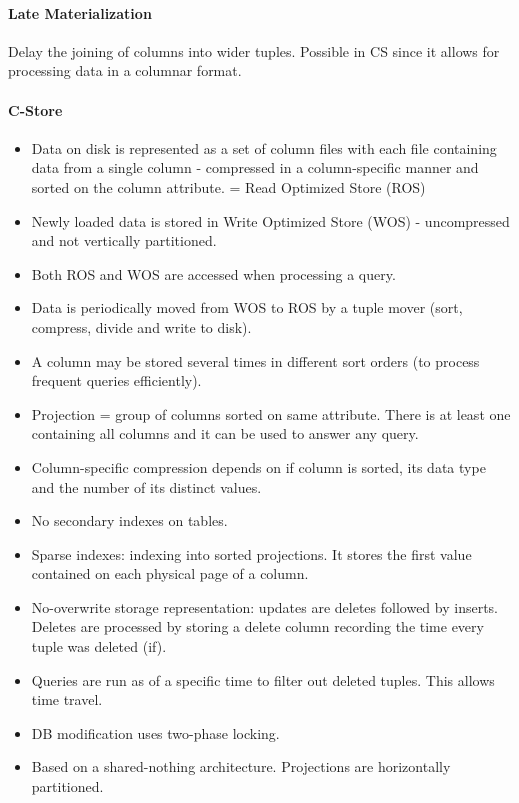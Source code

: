 \paragraph{Late Materialization}
Delay the joining of columns into wider tuples. Possible in CS since it allows for processing data in a columnar format.

\paragraph{C-Store}
\begin{itemize}
    \item Data on disk is represented as a set of column files with each file containing data from a single column - compressed in a column-specific manner and sorted on the column attribute. = Read Optimized Store (ROS)
    \item Newly loaded data is stored in Write Optimized Store (WOS) - uncompressed and not vertically partitioned.
    \item Both ROS and WOS are accessed when processing a query.
    \item Data is periodically moved from WOS to ROS by a tuple mover (sort, compress, divide and write to disk).
    \item A column may be stored several times in different sort orders (to process frequent queries efficiently).
    \item Projection = group of columns sorted on same attribute. There is at least one containing all columns and it can be used to answer any query.
    \item Column-specific compression depends on if column is sorted, its data type and the number of its distinct values.
    \item No secondary indexes on tables.
    \item Sparse indexes: indexing into sorted projections. It stores the first value contained on each physical page of a column.
    \item No-overwrite storage representation: updates are deletes followed by inserts. Deletes are processed by storing a delete column recording the time every tuple was deleted (if).
    \item Queries are run as of a specific time to filter out deleted tuples. This allows time travel.
    \item DB modification uses two-phase locking.
    \item Based on a shared-nothing architecture. Projections are horizontally partitioned.
\end{itemize}

